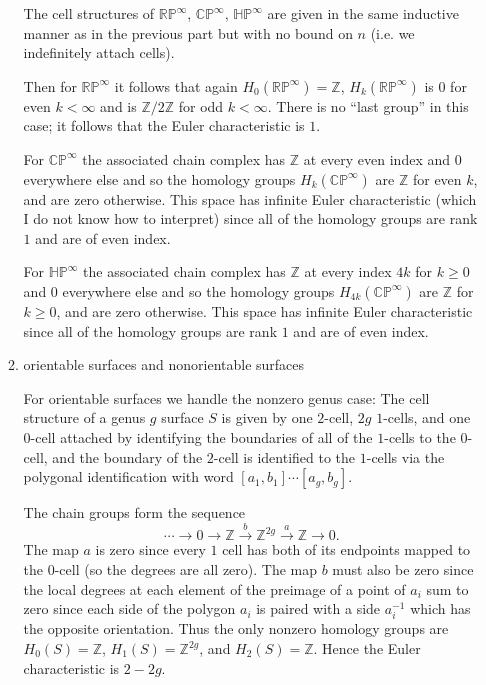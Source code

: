 \documentclass[11pt]{article}
\begin{document}
\begin{enumerate}
\begin{enumerate}
        The cell structures of $\mathbb{RP}^\infty$, $\mathbb{CP}^\infty$, $\mathbb{HP}^\infty$ are given in the same inductive manner as in the previous part but with no bound on $n$ (i.e. we indefinitely attach cells).

        Then for $\mathbb{RP}^\infty$ it follows that again $H_0(\mathbb{RP}^\infty) = \mathbb{Z}$, $H_k(\mathbb{RP}^\infty)$ is $0$ for even $k<\infty$ and is $\mathbb{Z}/2\mathbb{Z}$ for odd $k<\infty$. There is no ``last group'' in this case; it follows that the Euler characteristic is $1$.

        For $\mathbb{CP}^\infty$ the associated chain complex has $\mathbb{Z}$ at every even index and $0$ everywhere else and so the homology groups $H_k(\mathbb{CP}^\infty)$ are $\mathbb{Z}$ for even $k$, and are zero otherwise. This space has infinite Euler characteristic (which I do not know how to interpret) since all of the homology groups are rank $1$ and are of even index.

        For $\mathbb{HP}^\infty$ the associated chain complex has $\mathbb{Z}$ at every index $4k$ for $k\geq 0$ and $0$ everywhere else and so the homology groups $H_{4k}(\mathbb{CP}^\infty)$ are $\mathbb{Z}$ for $k\geq 0$, and are zero otherwise. This space has infinite Euler characteristic since all of the homology groups are rank $1$ and are of even index.
        \item orientable surfaces and nonorientable surfaces

        For orientable surfaces we handle the nonzero genus case: The cell structure of a genus $g$ surface $S$ is given by one $2$-cell, $2g$ $1$-cells, and one $0$-cell attached by identifying the boundaries of all of the $1$-cells to the $0$-cell, and the boundary of the $2$-cell is identified to the $1$-cells via the polygonal identification with word $[a_1,b_1]\cdots[a_g,b_g]$.

        The chain groups form the sequence \[\cdots \to 0\to \mathbb{Z}\xrightarrow{b} \mathbb{Z}^{2g}\xrightarrow{a} \mathbb{Z}\to 0.\] The map $a$ is zero since every $1$ cell has both of its endpoints mapped to the $0$-cell (so the degrees are all zero). The map $b$ must also be zero since the local degrees at each element of the preimage of a point of $a_i$ sum to zero since each side of the polygon $a_i$ is paired with a side $a_i^{-1}$ which has the opposite orientation. Thus the only nonzero homology groups are $H_0(S) = \mathbb{Z}$, $H_1(S) = \mathbb{Z}^{2g}$, and $H_2(S) = \mathbb{Z}$. Hence the Euler characteristic is $2-2g$.


\end{enumerate}
\end{enumerate}
\end{document}
